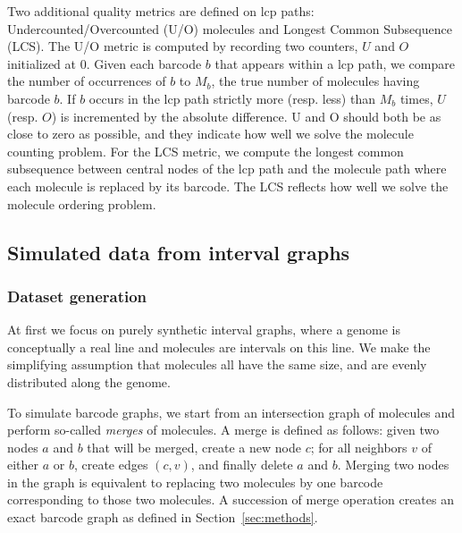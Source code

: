 \documentclass[a4paper,UKenglish,cleveref, autoref, thm-restate,authorcolumns]{lipics-v2019}
\begin{document}
Two additional quality metrics are defined on lcp paths: Undercounted/Overcounted (U/O) molecules and Longest Common Subsequence (LCS).
The U/O metric is computed by recording two counters, $U$ and $O$ initialized at 0. Given each barcode $b$ that appears within a lcp path, we compare the number of occurrences of $b$ to $M_b$, the true number of molecules having barcode $b$. If $b$ occurs in the lcp path strictly more (resp. less) than $M_b$ times, $U$ (resp. $O$) is incremented by the absolute difference. U and O should both be as close to zero as possible, and they indicate how well we solve the molecule counting problem. 
For the LCS metric, we compute the longest common subsequence between central nodes of the lcp path and the molecule path where each molecule is replaced by its barcode. The LCS reflects how well we solve the molecule ordering problem.


\subsection{Simulated data from interval graphs}

\subsubsection*{Dataset generation}

At first we focus on purely synthetic interval graphs, where a genome is conceptually a real line and molecules are intervals on this line.
We make the simplifying assumption that molecules all have the same size, and are evenly distributed along the genome.

To simulate barcode graphs, we start from an intersection graph of molecules and perform so-called \emph{merges} of molecules. A merge is defined as follows: given two nodes $a$ and $b$ that will be merged, create a new node $c$; for all neighbors $v$ of either $a$ or $b$, create edges $(c,v)$, and finally delete $a$ and $b$.
Merging two nodes in the graph is equivalent to replacing two molecules by one barcode corresponding to those two molecules. A succession of merge operation creates an exact barcode graph as defined in Section~\ref{sec:methods}. %
\end{document}
